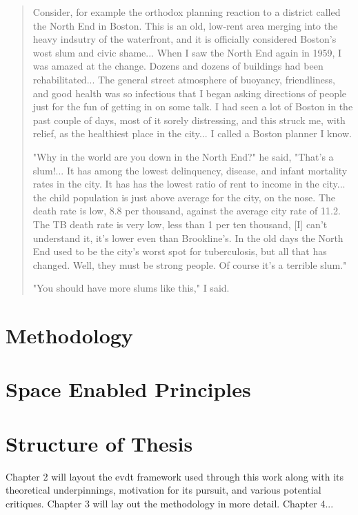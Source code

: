 \blockquote{Consider, for example the orthodox planning reaction to a district called the North End in Boston. This is an old, low-rent area merging into the heavy indsutry of the waterfront, and it is officially considered Boston's wost slum and civic shame... When I saw the North End again in 1959, I was amazed at the change. Dozens and dozens of buildings had been rehabilitated... The general street atmosphere of buoyancy, friendliness, and good health was so infectious that I began asking directions of people just for the fun of getting in on some talk. I had seen a lot of Boston in the past couple of days, most of it sorely distressing, and this struck me, with relief, as the healthiest place in the city... I called a Boston planner I know.

"Why in the world are you down in the North End?" he said, "That's a slum!... It has among the lowest delinquency, disease, and infant mortality rates in the city. It has has the lowest ratio of rent to income in the city... the child population is just above average for the city, on the nose. The death rate is low, 8.8 per thousand, against the average city rate of 11.2. The TB death rate is very low, less than 1 per ten thousand, [I] can't understand it, it's lower even than Brookline's. In the old days the North End used to be the city's worst spot for tuberculosis, but all that has changed. Well, they must be strong people. Of course it's a terrible slum."

"You should have more slums like this," I said.} 


\section{Methodology}

\section{Space Enabled Principles}


\section{Structure of Thesis}

Chapter 2 will layout the \ac{evdt} framework used through this work along with its theoretical underpinnings, motivation for its pursuit, and various potential critiques. Chapter 3 will lay out the methodology in more detail. Chapter 4...






